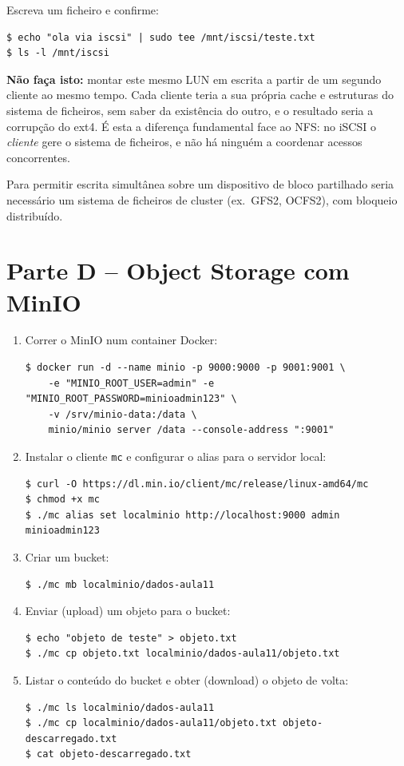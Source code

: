 \documentclass[11pt,a4paper]{article}
\begin{document}
\begin{enumerate}[label=\arabic*.]
    Escreva um ficheiro e confirme:
\begin{lstlisting}
$ echo "ola via iscsi" | sudo tee /mnt/iscsi/teste.txt
$ ls -l /mnt/iscsi
\end{lstlisting}

    \textbf{Não faça isto:} montar este mesmo LUN em escrita a partir de um segundo cliente ao mesmo tempo. Cada cliente teria a sua própria cache e estruturas do sistema de ficheiros, sem saber da existência do outro, e o resultado seria a corrupção do ext4. É esta a diferença fundamental face ao NFS: no iSCSI o \emph{cliente} gere o sistema de ficheiros, e não há ninguém a coordenar acessos concorrentes.

    Para permitir escrita simultânea sobre um dispositivo de bloco partilhado seria necessário um sistema de ficheiros de cluster (ex.\ GFS2, OCFS2), com bloqueio distribuído.
\end{enumerate}

\section{Parte D -- Object Storage com MinIO}
\begin{enumerate}[label=\arabic*.]
    \item Correr o MinIO num container Docker:
\begin{lstlisting}
$ docker run -d --name minio -p 9000:9000 -p 9001:9001 \
    -e "MINIO_ROOT_USER=admin" -e "MINIO_ROOT_PASSWORD=minioadmin123" \
    -v /srv/minio-data:/data \
    minio/minio server /data --console-address ":9001"
\end{lstlisting}

    \item Instalar o cliente \texttt{mc} e configurar o alias para o servidor local:
\begin{lstlisting}
$ curl -O https://dl.min.io/client/mc/release/linux-amd64/mc
$ chmod +x mc
$ ./mc alias set localminio http://localhost:9000 admin minioadmin123
\end{lstlisting}

    \item Criar um bucket:
\begin{lstlisting}
$ ./mc mb localminio/dados-aula11
\end{lstlisting}

    \item Enviar (upload) um objeto para o bucket:
\begin{lstlisting}
$ echo "objeto de teste" > objeto.txt
$ ./mc cp objeto.txt localminio/dados-aula11/objeto.txt
\end{lstlisting}

    \item Listar o conteúdo do bucket e obter (download) o objeto de volta:
\begin{lstlisting}
$ ./mc ls localminio/dados-aula11
$ ./mc cp localminio/dados-aula11/objeto.txt objeto-descarregado.txt
$ cat objeto-descarregado.txt
\end{lstlisting}
\end{enumerate}
\end{document}
